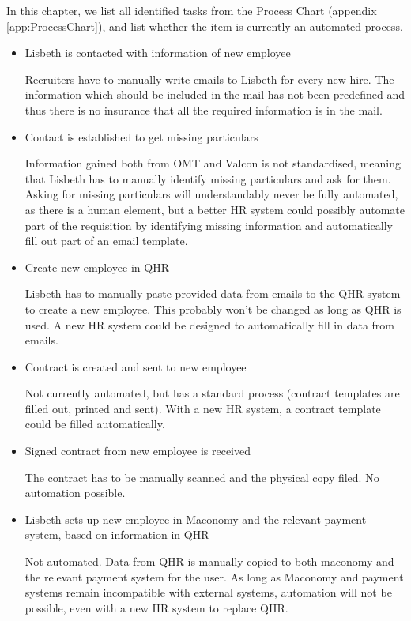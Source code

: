 \label{app:automatise}
In this chapter, we list all identified tasks from the Process Chart (appendix \ref*{app:ProcessChart}), and list whether the item is currently an automated process. 

\begin{itemize}
	\item{Lisbeth is contacted with information of new employee}
	
		Recruiters have to manually write emails to Lisbeth for every new hire. The information which should be included in the mail has not been predefined and thus there is no insurance that all the required information is in the mail.
		
	\item{Contact is established to get missing particulars}
	
		Information gained both from OMT and Valcon is not standardised, meaning that Lisbeth has to manually identify missing particulars and ask for them. Asking for missing particulars will understandably never be fully automated, as there is a human element, but a better HR system could possibly automate part of the requisition by identifying missing information and automatically fill out part of an email template.
		
	\item{Create new employee in QHR}
	
		Lisbeth has to manually paste provided data from emails to the QHR system to create a new employee. This probably won't be changed as long as QHR is used. A new HR system could be designed to automatically fill in data from emails.
	
	\item{Contract is created and sent to new employee}
	
		Not currently automated, but has a standard process (contract templates are filled out, printed and sent).
		With a new HR system, a contract template could be filled automatically.
	
	\item{Signed contract from new employee is received}
	
		The contract has to be manually scanned and the physical copy filed. No automation possible.
	
	\item{Lisbeth sets up new employee in Maconomy and the relevant payment system, based on information in QHR}
	
		Not automated. Data from QHR is manually copied to both maconomy and the relevant payment system for the user.
		As long as Maconomy and payment systems remain incompatible with external systems, automation will not be possible, even with a new HR system to replace QHR.
	

\end{itemize}
